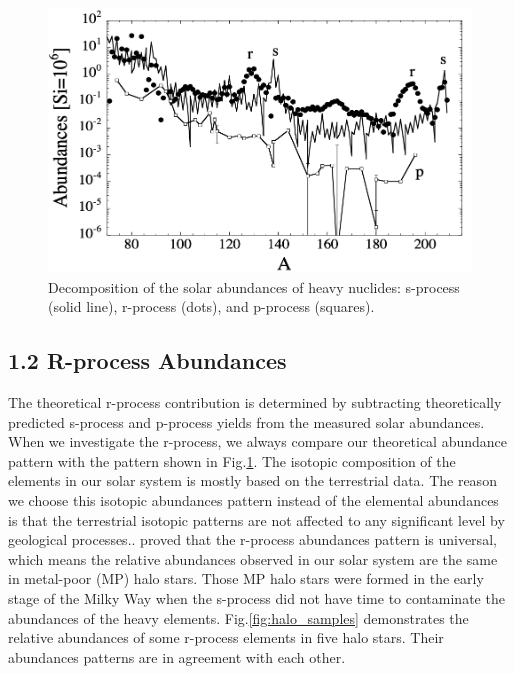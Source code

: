 \documentclass[aps,prl,preprint,groupedaddress]{revtex4}
\begin{document}
\begin{figure}
\centering
\includegraphics[scale=0.3]{decompose_solar}
\caption{
Decomposition of the solar abundances of heavy nuclides: s-process (solid line), r-process (dots), and p-process (squares).
}
\label{fig:decompose_solar}
\end{figure}

\subsection{1.2 R-process Abundances}
The theoretical r-process contribution is determined by subtracting theoretically predicted s-process and p-process yields from the measured solar abundances. When we investigate the r-process, we always compare our theoretical abundance pattern with the pattern shown in Fig.\ref{fig:decompose_solar}. The isotopic composition of the elements in our solar system is mostly based on the terrestrial data. The reason we choose this isotopic abundances pattern instead of the elemental abundances is that the terrestrial isotopic patterns are not affected to any significant level by geological processes.\cite{2007PhR...450...97A}. \cite{0004-637X-544-1-302} proved that the r-process abundances pattern is universal, which means the relative abundances observed in our solar system are the same in metal-poor (MP) halo stars. Those MP halo stars were formed in the early stage of the Milky Way when the s-process did not have time to contaminate the abundances of the heavy elements. Fig.\ref{fig:halo_samples} demonstrates the relative abundances of some r-process elements in five halo stars. Their abundances patterns are in agreement with each other.\\
\end{document}
